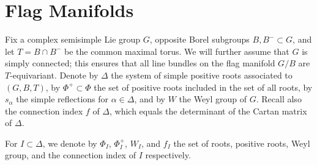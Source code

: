 \documentclass[10pt]{article}
\numberwithin{thm}{section}
\newtheorem{cor}[thm]{Corollary}
\theoremstyle{definition}
\theoremstyle{remark}
\begin{document}


\section{Flag Manifolds}
\label{sec:preliminaries}

Fix a complex semisimple Lie group $G$,
opposite Borel subgroups $B, B^- \subset G$,
and let $T= B \cap B^-$ be the common maximal torus.
We will further assume that $G$ is simply connected;
this ensures that all line bundles on the flag manifold $G/B$ are $T$-equivariant.
Denote by $\Delta$ the system of simple positive roots associated to $(G,B,T)$,
by $\Phi^+ \subset \Phi$ the set of positive roots included in the set of all roots,
by $s_\alpha$ the simple reflections for $\alpha\in\Delta$,
and by $W$ the Weyl group of $G$.
Recall also the connection index $f$ of $\Delta$,
which equals the determinant of the Cartan matrix of $\Delta$.

For $I\subset \Delta$, we denote by $\Phi_I$, $\Phi^+_I$, $W_I$, and $f_I$ 
the set of roots, positive roots, Weyl group, and the connection index of $I$ respectively.
\end{document}
